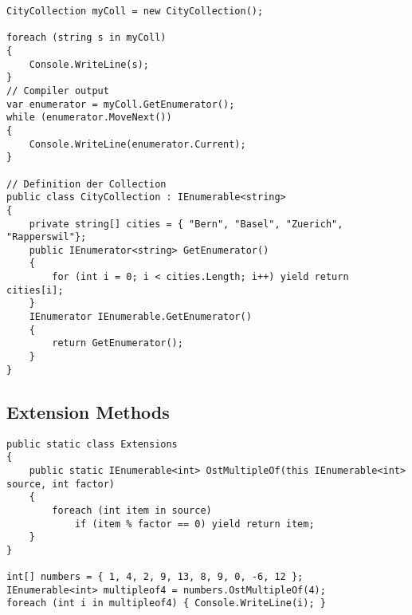 \begin{lstlisting}
CityCollection myColl = new CityCollection();

foreach (string s in myColl)
{
    Console.WriteLine(s);
}
// Compiler output
var enumerator = myColl.GetEnumerator();
while (enumerator.MoveNext())
{
    Console.WriteLine(enumerator.Current);
}

// Definition der Collection
public class CityCollection : IEnumerable<string>
{
    private string[] cities = { "Bern", "Basel", "Zuerich", "Rapperswil"};
    public IEnumerator<string> GetEnumerator()
    {
        for (int i = 0; i < cities.Length; i++) yield return cities[i];
    }
    IEnumerator IEnumerable.GetEnumerator()
    {
        return GetEnumerator();
    }
}
\end{lstlisting}

\subsection{Extension Methods}

\begin{lstlisting}
public static class Extensions
{
    public static IEnumerable<int> OstMultipleOf(this IEnumerable<int> source, int factor)
    {
        foreach (int item in source)
            if (item % factor == 0) yield return item;      
    }
}

int[] numbers = { 1, 4, 2, 9, 13, 8, 9, 0, -6, 12 };
IEnumerable<int> multipleof4 = numbers.OstMultipleOf(4);
foreach (int i in multipleof4) { Console.WriteLine(i); }
\end{lstlisting}








